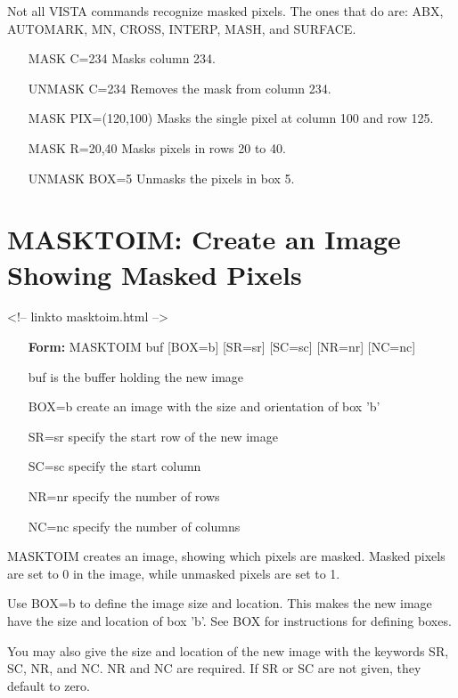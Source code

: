 Not all VISTA commands recognize masked pixels.  The ones that do are: ABX,
AUTOMARK, MN, CROSS, INTERP, MASH, and SURFACE.

\begin{itemize}
  \item[MASK C=234\hfill]{Masks column 234.}
  \item[UNMASK C=234\hfill]{Removes the mask from column 234.}
  \item[MASK PIX=(120,100)\hfill]{Masks the single pixel at
column 100 and row 125.}
  \item[MASK R=20,40\hfill]{Masks pixels in rows 20 to 40.}
  \item[UNMASK BOX=5\hfill]{Unmasks the pixels in box 5.}
\end{itemize}

\section{MASKTOIM: Create an Image Showing Masked Pixels}
\begin{rawhtml}
<!-- linkto masktoim.html -->
\end{rawhtml}
\begin{itemize}
  \item[\textbf{Form:}  MASKTOIM buf {[BOX=b]} {[SR=sr]} {[SC=sc]} {[NR=nr]} {[NC=nc]}\hfill]{}
  \item[buf]{is the buffer holding the new image}
  \item[BOX=b]{create an image with the size and orientation of box 'b'}
  \item[SR=sr]{specify the start row of the new image}
  \item[SC=sc]{specify the start column}
  \item[NR=nr]{specify the number of rows}
  \item[NC=nc]{specify the number of columns}
\end{itemize}

MASKTOIM creates an image, showing which pixels are masked.  Masked pixels
are set to 0 in the image, while unmasked pixels are set to 1.

Use BOX=b to define the image size and location.  This makes the new image
have the size and location of box 'b'.  See BOX for instructions for
defining boxes.

You may also give the size and location of the new image with the keywords
SR, SC, NR, and NC.  NR and NC are required.  If SR or SC are not given,
they default to zero.


